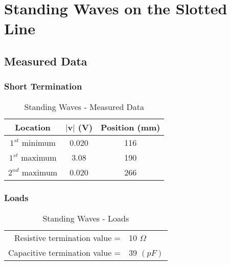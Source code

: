\documentclass{article}
\begin{document}
\section{Standing Waves on the Slotted Line}
\subsection{Measured Data}
\subsubsection{Short Termination}
\begin{table}[h]
\centering
	\begin{tabular}{|c|c|c|}
	\hline
	\textbf{Location} & $\mid$v$\mid$ (V) & \textbf{Position (mm)} \\ \hline
	$1^{st}$ minimum       & 0.020   & 116                    \\ \hline
	$1^{st}$ maximum       & 3.08    & 190                    \\ \hline
	$2^{nd}$ maximum       & 0.020   & 266                    \\ \hline
	\end{tabular}
	\caption{Standing Waves - Measured Data}
	\label{my-label}
\end{table}

\subsubsection{Loads}

\begin{table}[h]
	\begin{tabular}{rl}
	Resistive termination value =  & 10 $\Omega$ \\
	Capacitive termination value = & 39 $(pF)$      
	\end{tabular}
	\caption{Standing Waves - Loads}
	\label{my-label}
\end{table}
\end{document}
